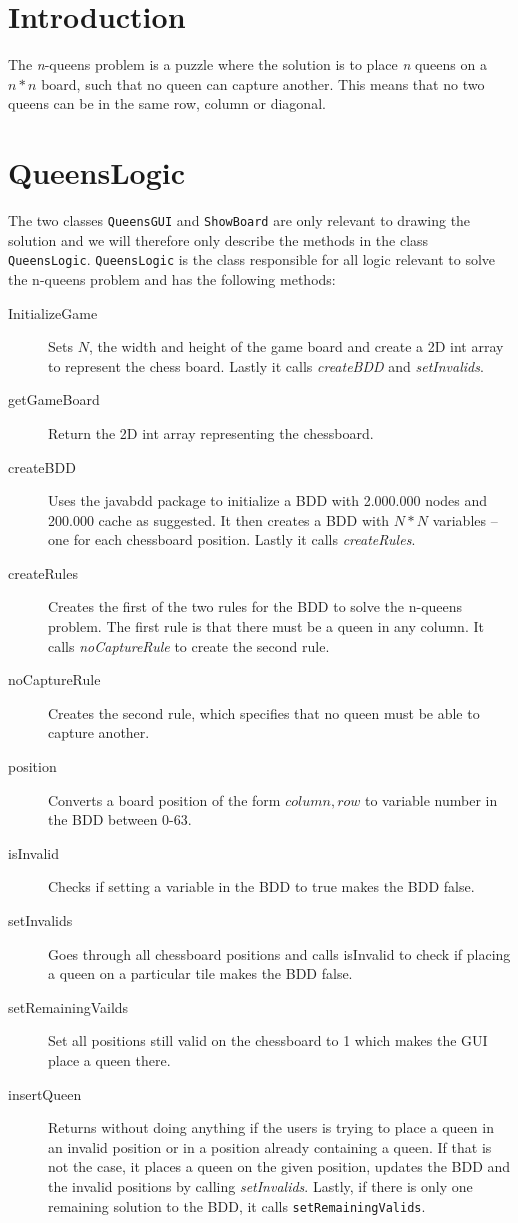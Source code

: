 \section{Introduction}
The \textit{n}-queens problem is a puzzle where the solution is to place \textit{n} queens on a $n*n$ board, such that no queen can capture another. This means that no two queens can be in the same row, column or diagonal.
\section{QueensLogic}
The two classes \texttt{QueensGUI} and \texttt{ShowBoard} are only relevant to drawing the solution and we will therefore only describe the methods in the class \texttt{QueensLogic}. \texttt{QueensLogic} is the class responsible for all logic relevant to solve the n-queens problem and has the following methods:
\begin{description}
	\item[InitializeGame] Sets $N$, the width and height of the game board and create a 2D int array to represent the chess board. Lastly it calls \textit{createBDD} and \textit{setInvalids}.
	\item[getGameBoard] Return the 2D int array representing the chessboard.
	\item[createBDD] Uses the javabdd package to initialize a BDD with 2.000.000 nodes and 200.000 cache as suggested. It then creates a BDD with $N*N$ variables -- one for each chessboard position. Lastly it calls \textit{createRules}.
	\item[createRules] Creates the first of the two rules for the BDD to solve the n-queens problem. The first rule is that there must be a queen in any column. It calls \textit{noCaptureRule} to create the second rule.
	\item[noCaptureRule] Creates the second rule, which specifies that no queen must be able to capture another.
	\item[position] Converts a board position of the form $column, row$ to variable number in the BDD between 0-63.	
	\item[isInvalid] Checks if setting a variable in the BDD to true makes the BDD false. 
	\item[setInvalids] Goes through all chessboard positions and calls isInvalid to check if placing a queen on a particular tile makes the BDD false.
	\item[setRemainingVailds] Set all positions still valid on the chessboard to 1 which makes the GUI place a queen there.
	\item[insertQueen] Returns without doing anything if the users is trying to place a queen in an invalid position or in a position already containing a queen. If that is not the case, it places a queen on the given position, updates the BDD and the invalid positions by calling \textit{setInvalids}. Lastly, if there is only one remaining solution to the BDD, it calls \texttt{setRemainingValids}.
\end{description}


